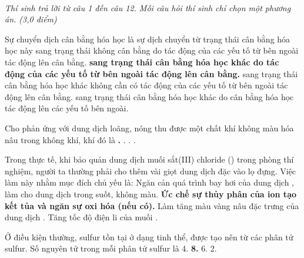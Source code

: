 \documentclass[11pt,a4paper]{article}
\begin{document}
 \\
\textit{Thí sinh trả lời từ câu 1 đến câu 12. Mỗi câu hỏi thí sinh chỉ chọn một phương án. (3,0 điểm)}
\vspace{4pt}
\begin{ex}
Sự chuyển dịch cân bằng hóa học là sự dịch chuyển từ trạng thái cân bằng hóa học này
\choice
{sang trạng thái không cân bằng do tác động của các yếu tố từ bên ngoài tác động lên cân bằng.}
{\textbf{\color{hfRed}sang trạng thái cân bằng hóa học khác do tác động của các yếu tố từ bên ngoài tác động lên cân bằng.}}
{sang trạng thái cân bằng hóa học khác không cần có tác động của các yếu tố từ bên ngoài tác động lên cân bằng.}
{sang trạng thái cân bằng hóa học khác do cân bằng hóa học tác động lên các yếu tố bên ngoài.}
\end{ex}
\begin{ex}
Cho  phản ứng với dung dịch  loãng, nóng thu được một chất khí không màu hóa nâu trong không khí, khí đó là
\choice
{\textbf{\color{hfRed}.}}
{.}
{.}
{.}
\end{ex}
\begin{ex}
Trong thực tế, khi bảo quản dung dịch muối sắt(III) chloride () trong phòng thí nghiệm, người ta thường phải cho thêm vài giọt dung dịch  đặc vào lọ đựng. Việc làm này nhằm mục đích chủ yếu là:
\choice
{Ngăn cản quá trình bay hơi của dung dịch , làm cho dung dịch trong suốt, không màu.}
{\textbf{\color{hfRed}Ức chế sự thủy phân của ion  tạo kết tủa  và ngăn sự oxi hóa  (nếu có).}}
{Làm tăng màu vàng nâu đặc trưng của dung dịch .}
{Tăng tốc độ điện li của muối .}
\end{ex}
\begin{ex}
Ở điều kiện thường, sulfur tồn tại ở dạng tinh thể, được tạo nên từ các phân tử sulfur. Số nguyên tử trong mỗi phân tử sulfur là
\choice
{4.}
{\textbf{\color{hfRed}8.}}
{6.}
{2.}
\end{ex}
\end{document}
